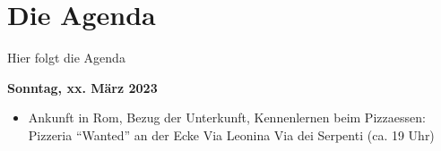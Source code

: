 \chapter*{Die Agenda}
Hier folgt die Agenda

\begin{description}
\item {\textbf{Sonntag, xx. März 2023}}
\begin{itemize}
\item[~] {Ankunft in Rom, Bezug der Unterkunft, Kennenlernen beim Pizzaessen: 
   Pizzeria ``Wanted'' an der Ecke Via Leonina Via dei Serpenti} (ca. 19 Uhr)
\end{itemize}
\smallskip

\end{description}

